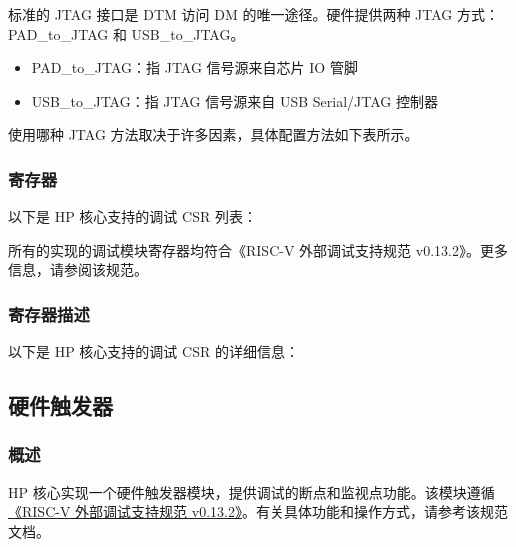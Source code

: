 \documentclass[main\_\_CN.tex]{subfiles}
\begin{document}
标准的 JTAG 接口是 DTM 访问 DM 的唯一途径。硬件提供两种 JTAG 方式：PAD\_to\_JTAG 和 USB\_to\_JTAG。

\begin{itemize}
    \item {PAD\_to\_JTAG：指 JTAG 信号源来自芯片 IO 管脚}
    \item {USB\_to\_JTAG：指 JTAG 信号源来自 USB Serial/JTAG 控制器}
\end{itemize}

使用哪种 JTAG 方法取决于许多因素，具体配置方法如下表所示。






\hypertarget{riscvcpu-dbg-reg-summ}{}
\subsubsection{寄存器}
\label{sec:riscvcpu-dbg-reg-summ}

以下是 HP 核心支持的调试 CSR 列表：


所有的实现的调试模块寄存器均符合《RISC-V 外部调试支持规范 v0.13.2》。更多信息，请参阅该规范。



\subsubsection{寄存器描述}
以下是 HP 核心支持的调试 CSR 的详细信息：
















\newpage
\subsection{硬件触发器}
\label{sec:riscvcpu-hwt}

\subsubsection{概述}
\label{sec:riscvcpu-hwt-overview}
HP 核心实现一个硬件触发器模块，提供调试的断点和监视点功能。该模块遵循 \href{https://riscv.org/wp-content/uploads/2019/03/riscv-debug-release.pdf}{《RISC-V 外部调试支持规范 v0.13.2》}。有关具体功能和操作方式，请参考该规范文档。
\end{document}

